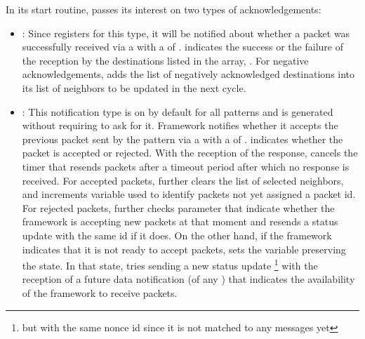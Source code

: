 In its start routine,  passes its interest on two types of acknowledgements: 
\begin{itemize}
\item {}: Since  registers for this type, it will be notified about
whether a packet was successfully received via a  with a  of . 
 indicates the success or the failure of the reception by the  destinations listed in the array, .
For negative acknowledgements,  adds the list of negatively acknowledged destinations into its list of neighbors to be updated in the next cycle. 


\item {}: This notification type is on by default for all patterns and is generated without requiring to ask for it. Framework notifies  whether it accepts the previous packet sent by the pattern via a  with a  of .  indicates whether the packet is accepted or rejected. 
With the reception of the response,  
cancels the timer that resends packets after a timeout period after which no response is received. 
For accepted packets,  further clears the list of selected neighbors, and increments  variable used to identify packets not yet assigned a packet id.
For rejected packets,  further checks  parameter that indicate whether the framework is accepting new packets at that moment and resends a status update with the same  id if it does. 
On the other hand, if the framework indicates that it is not ready to accept packets,  sets the  variable preserving the state. 
In that state,  tries sending a new status update%
\footnote{but with the same nonce id since it is not matched to any messages yet}
with the reception of a future data notification (of any ) that indicates the availability of the framework to receive packets.   

\end{itemize}

